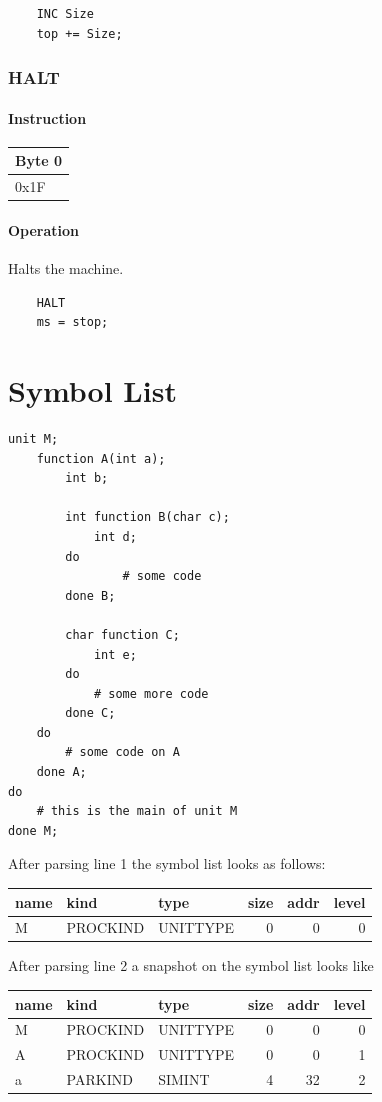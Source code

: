 \documentclass[11pt]{report}
\newcommand{\onebyteinstruction}[1]{
\begin{tabular}{|p{3.9em}|}
\hline
\tiny{Byte 0} \\ \hline
#1  \\ \hline
\end{tabular}
}
\begin{document}
	\begin{lstlisting}
	INC Size
	top += Size;
	\end{lstlisting}

\subsection{HALT}
\subsubsection{Instruction}
\onebyteinstruction{0x1F}

\subsubsection{Operation}
Halts the machine.

	\begin{lstlisting}
	HALT
	ms = stop;
	\end{lstlisting}

\chapter{Symbol List}

\lstset{language=NoBeard,
	numbers=left,
	tabsize=2
}
\begin{lstlisting}
unit M;
	function A(int a);
		int b;
		
		int function B(char c);
			int d;
		do
				# some code
		done B;
		
		char function C;
			int e;
		do
			# some more code
		done C;
	do
		# some code on A
	done A;
do
	# this is the main of unit M
done M;
\end{lstlisting}

After parsing line 1 the symbol list looks as follows:

\begin{tabular}{lllrrr}
name & kind & type & size & addr & level \\
\hline
M & PROCKIND & UNITTYPE & 0 & 0 & 0
\end{tabular}

After parsing line 2 a snapshot on the symbol list looks like

\begin{tabular}{lllrrr}
name & kind & type & size & addr & level \\
\hline
M & PROCKIND & UNITTYPE & 0 & 0 & 0 \\
A & PROCKIND & UNITTYPE & 0 & 0 & 1 \\
a & PARKIND & SIMINT & 4 & 32 & 2
\end{tabular}
\end{document}
